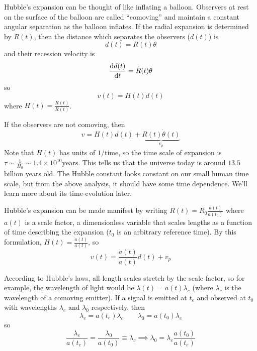 \documentclass[a4paper,twoside,master.tex]{subfiles}
\begin{document}
Hubble's expansion can be thought of like inflating a balloon. Observers at rest on the surface of the balloon are called ``comoving'' and maintain a constant angular separation as the balloon inflates. If the radial expansion is determined by $ R(t) $, then the distance which separates the observers ($ d(t) $) is
\begin{equation}
    d(t) = R(t) \theta
\end{equation}
and their recession velocity is
\begin{equation}
    \dv{d(t)}{t} = \dot{R}(t) \theta
\end{equation}
so
\begin{equation}
    v(t) = H(t) d(t)
\end{equation}
where $ H(t) = \frac{\dot{R}(t)}{R(t)} $.

If the observers are not comoving, then
\begin{equation}
    v = H(t) d(t) + \underbrace{R(t) \dot{\theta}(t)}_{v_p}
\end{equation}
Note that $ H(t) $ has units of $ 1 / \text{time} $, so the time scale of expansion is $ \tau \sim \frac{1}{H_0} \sim 1.4 \times 10^{10} \text{years} $. This tells us that the universe today is around $ 13.5 $ billion years old. The Hubble constant looks constant on our small human time scale, but from the above analysis, it should have some time dependence. We'll learn more about its time-evolution later.


Hubble's expansion can be made manifest by writing $ R(t) = R_0 \frac{a(t)}{a(t_0)} $ where $ a(t) $ is a scale factor, a dimensionless variable that scales lengths as a function of time describing the expansion ($ t_0 $ is an arbitrary reference time). By this formulation, $ H(t) = \frac{\dot{a}(t)}{a(t)} $, so
\begin{equation}
    v(t) = \frac{\dot{a}(t)}{a(t)} d(t) + v_p
\end{equation}

According to Hubble's laws, all length scales stretch by the scale factor, so for example, the wavelength of light would be $ \lambda(t) = a(t) \lambda_c $ (where $ \lambda_c $ is the wavelength of a comoving emitter). If a signal is emitted at $ t_e $ and observed at $ t_0 $ with wavelengths $ \lambda_e $ and $ \lambda_0  $ respectively, then
\begin{equation}
    \lambda_e = a(t_e) \lambda_c \qquad \lambda_0 = a(t_0) \lambda_c
\end{equation}
so
\begin{equation}
    \frac{\lambda_e}{a(t_e)} = \frac{\lambda_0}{a(t_0)} \equiv \lambda_c \implies \lambda_0 = \lambda_e \frac{a(t_0)}{a(t_e)}
\end{equation}
\end{document}

